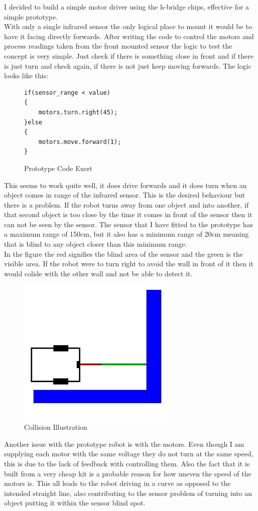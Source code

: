I decided to build a simple motor driver using the h-bridge chips, effective for a simple prototype.
\\With only a single infrared sensor the only logical place to mount it would be to have it facing directly forwards.  After writing the code to control the motors and process readings taken from the front mounted sensor the logic to test the concept is very simple.  Just check if there is something close in front and if there is just turn and check again, if there is not just keep moving forwards.
The logic looks like this:
\begin{figure}[h]
\begin{lstlisting}[basicstyle=\ttfamily]
if(sensor_range < value)
{
	motors.turn.right(45);
}else
{
	motors.move.forward(1);
}
\end{lstlisting}
\caption{Prototype Code Exert}
\label{Prototype Code Exert}
\end{figure}
This seems to work quite well, it does drive forwards and it does turn when an object comes in range of the infrared sensor.  This is the desired behaviour but there is a problem.  If the robot turns away from one object and into another, if that second object is too close by the time it comes in front of the sensor then it can not be seen by the sensor.  The sensor that I have fitted to the prototype has a maximum range of 150cm, but it also has a minimum range of 20cm meaning that is blind to any object closer than this minimum range.
\\In the figure the red signifies the blind area of the sensor and the green is the visible area.  If the robot were to turn right to avoid the wall in front of it then it would colide with the other wall and not be able to detect it.
\begin{figure}[h]
\centering
        \includegraphics[width=3.0in]  {Images/ir-demo.png}
        \caption{Collision Illustration}
        \label{Collision Illustration}
\end{figure}
Another issue with the prototype robot is with the motors.  Even though I am supplying each motor with the same voltage they do not turn at the same speed, this is due to the lack of feedback with controlling them.  Also the fact that it is built from a very cheap kit is a probable reason for how uneven the speed of the motors is.  This all leads to the robot driving in a curve as opposed to the intended straight line, also contributing to the sensor problem of turning into an object putting it within the sensor blind spot.
